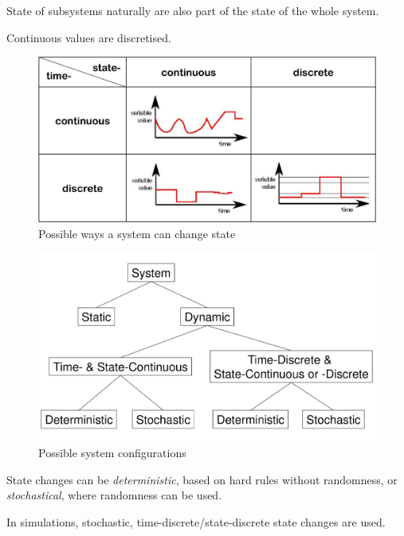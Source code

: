\documentclass[english]{panikzettel}
\begin{document}
	State of subsystems naturally are also part of the state of the whole system.

	Continuous values are discretised. 

	\begin{halfboxl}
		\begin{figure}[H]
			\centering
			\includegraphics[width=\textwidth]{img/5-system-state-changes.png}
			\caption{Possible ways a system can change state}
			\label{img-5-system-state-changes}
		\end{figure}
	\end{halfboxl}%
	\begin{halfboxr}
		\begin{figure}[H]
			\centering
			\includegraphics[width=\textwidth]{img/5-system-overview.png}
			\caption{Possible system configurations}
			\label{img-5-system-overview}
		\end{figure}
	\end{halfboxr}


	State changes can be \textit{deterministic}, based on hard rules without randomness, or \textit{stochastical}, where randomness can be used.

	In simulations, stochastic, time-discrete/state-discrete state changes are used.
\end{document}
